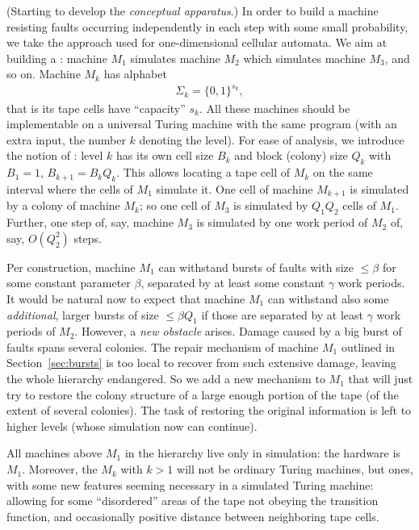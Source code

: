 \documentclass[11pt]{memoir}
\theoremstyle{definition} %
\renewcommand{\le}{\leq}
\def\B{B}
\newcommand{\Q}{Q} %
\begin{document}
(Starting to develop the \emph{conceptual apparatus}.)
In order to build a machine resisting faults 
occurring independently in each step with some small probability,
we take the approach used for one-dimensional cellular automata.
We aim at building a :
machine \( M_{1} \) simulates machine \( M_{2} \) which simulates machine \( M_{3} \), and so on.
Machine \( M_{k} \) has alphabet
\begin{align}\label{eq:Sigma_k}
   \Sigma_{k}=\{0,1\}^{s_{k}},
\end{align}
that is its tape cells have ``capacity'' \( s_{k} \).
All these machines should be implementable on a universal Turing machine with
the same program (with an extra input, the number \( k \) denoting the level).
For ease of analysis, we introduce the notion of :
level \( k \) has its own cell size \( \B_{k} \) and block (colony) size \( \Q_{k} \)
with \( B_{1}=1 \), \( \B_{k+1}=\B_{k}\Q_{k} \).
This allows
locating a tape cell of \( M_{k} \) on the same interval where the cells of \( M_{1} \) simulate it.
One cell of machine \( M_{k+1} \) is simulated by a colony of machine \( M_{k} \);
so one cell of \( M_{3} \) is simulated by \( \Q_{1}\Q_{2} \) cells of \( M_{1} \).
Further, one step of, say, machine \( M_{3} \) is simulated by one
work period of \( M_{2} \) of, say, \( O(\Q_{2}^{2}) \) steps.

Per construction, machine \( M_{1} \) can withstand
bursts of faults with size  \( \le \beta \) for some constant parameter \( \beta \),
separated by at least some constant \( \gamma \) work periods.
It would be natural now to expect that machine
\( M_{1} \) can withstand also some \emph{additional}, larger bursts
of size \( \le \beta \Q_{1} \) if those are separated
by at least \( \gamma \) work periods of \( M_{2} \).
However, a \emph{new obstacle} arises.
Damage caused by a big burst of faults spans several colonies.
The repair mechanism of machine \( M_{1} \) outlined in Section~\ref{sec:bursts} 
is too local to recover from such extensive damage, leaving
the whole hierarchy endangered.
So we add a new mechanism to \( M_{1} \) that
will just try to restore the colony structure of a large enough portion of the
tape (of the extent of several colonies).
The task of restoring the original information is left to higher levels (whose simulation
now can continue).

All machines above \( M_{1} \) in the hierarchy live only in simulation: the hardware is \( M_{1} \).
Moreover, the \( M_{k} \) with \( k>1 \)
will not be ordinary Turing machines, but  ones,
with some new features seeming necessary in a simulated Turing machine:
allowing for some ``disordered'' areas of the tape not obeying the transition function,
and occasionally positive distance between neighboring tape cells.
\end{document}
